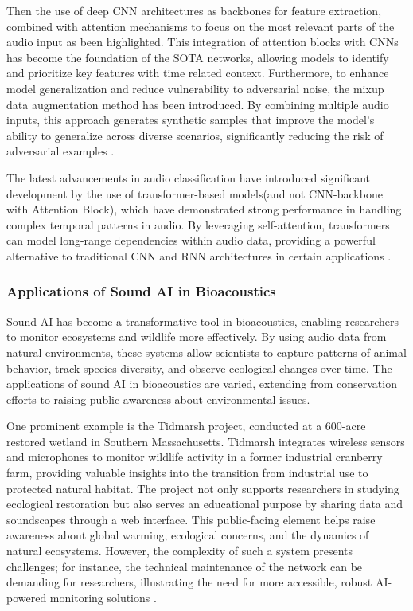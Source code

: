 Then the use of deep CNN architectures as backbones for feature extraction, combined with attention mechanisms to focus on the most relevant parts of the audio input as been highlighted. This integration of attention blocks with CNNs has become the foundation of the SOTA networks, allowing models to identify and prioritize key features with time related context\cite{conde2022few}. Furthermore, to enhance model generalization and reduce vulnerability to adversarial noise, the mixup data augmentation method has been introduced. By combining multiple audio inputs, this approach generates synthetic samples that improve the model’s ability to generalize across diverse scenarios, significantly reducing the risk of adversarial examples \cite{zhang2017mixup}.

The latest advancements in audio classification have introduced significant development by the use of transformer-based models(and not CNN-backbone with Attention Block), which have demonstrated strong performance in handling complex temporal patterns in audio. By leveraging self-attention, transformers can model long-range dependencies within audio data, providing a powerful alternative to traditional CNN and RNN architectures in certain applications \cite{puget2021stft}.

\subsubsection{Applications of Sound AI in Bioacoustics}

Sound AI has become a transformative tool in bioacoustics, enabling researchers to monitor ecosystems and wildlife more effectively. By using audio data from natural environments, these systems allow scientists to capture patterns of animal behavior, track species diversity, and observe ecological changes over time. The applications of sound AI in bioacoustics are varied, extending from conservation efforts to raising public awareness about environmental issues.

One prominent example is the Tidmarsh project, conducted at a 600-acre restored wetland in Southern Massachusetts. Tidmarsh integrates wireless sensors and microphones to monitor wildlife activity in a former industrial cranberry farm, providing valuable insights into the transition from industrial use to protected natural habitat. The project not only supports researchers in studying ecological restoration but also serves an educational purpose by sharing data and soundscapes through a web interface. This public-facing element helps raise awareness about global warming, ecological concerns, and the dynamics of natural ecosystems. However, the complexity of such a system presents challenges; for instance, the technical maintenance of the network can be demanding for researchers, illustrating the need for more accessible, robust AI-powered monitoring solutions \cite{duhart2018deep,duhart2019deep}.

